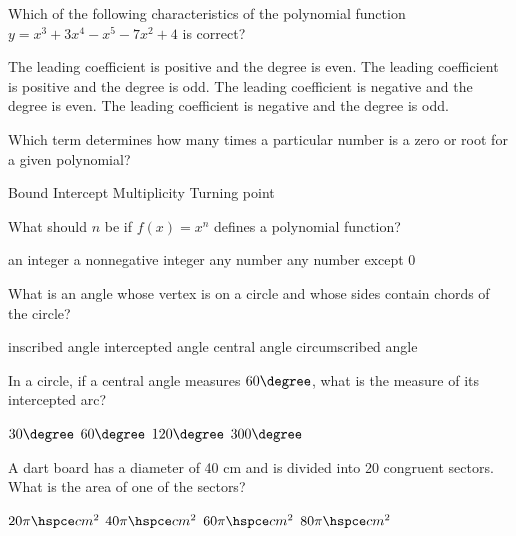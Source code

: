 \begin{questions}
\question Which of the following characteristics of the polynomial function $y = x^3 + 3x^4 - x^5 - 7x^2 + 4$ is correct? 
\begin{choices}  
\choice The leading coefficient is positive and the degree is even. 
\choice The leading coefficient is positive and the degree is odd.
\choice The leading coefficient is negative and the degree is even.
\CorrectChoice   The leading coefficient is negative and the degree is odd.
\end{choices}

\question Which term determines how many times a particular number is a zero or root for a given polynomial? 

\begin{multicols}{4}
\begin{choices}  
\choice Bound
\choice Intercept
\CorrectChoice Multiplicity
\choice  Turning point
\end{choices}
\end{multicols} 

\question What should $n$ be if $f(x) = x^n$ defines a polynomial function? 
\begin{multicols}{2}
\begin{choices}  
\choice an integer
\CorrectChoice a nonnegative integer
\choice any number
\choice any number except 0
\end{choices}
\end{multicols} 

\question What is an angle whose vertex is on a circle and whose sides contain chords of the circle?  
\begin{multicols}{2}
\begin{choices} 
\CorrectChoice inscribed angle
\choice intercepted angle
\choice central angle
\choice circumscribed angle
\end{choices}
\end{multicols} 

\question In a circle, if a central angle measures $60\degree$, what is the measure of its intercepted arc? 

\begin{multicols}{4}
\begin{choices}  
\choice $30\degree$ 
\CorrectChoice $60\degree$ 
\choice $120\degree$ 
\choice $300\degree$ 
\end{choices}
\end{multicols} 

\question A dart board has a diameter of 40 cm and is divided into 20 congruent       sectors. What is the area of one of the sectors?    
\begin{multicols}{4}
\begin{choices}  
\choice $20\pi \hspce cm^2$
\choice $40\pi \hspce cm^2$
\choice $60\pi \hspce cm^2$
\choice $80\pi \hspce cm^2$
\end{choices}
\end{multicols} 


\end{questions}
